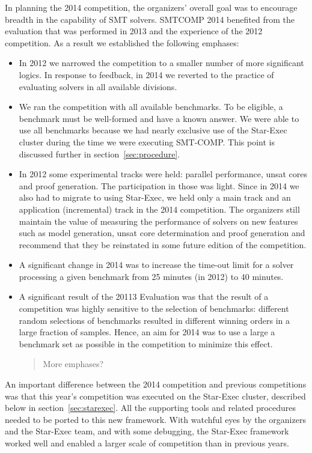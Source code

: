 \documentclass[twosize,11pt]{article}
\newcommand{\comment}[2]{\begin{quote}\sc #1\marginpar{\textcolor{red}{$\ast^{\mbox{#2}}$}}\end{quote}}
\newcommand{\davidc}[1]{\comment{#1}{DC}}
\begin{document}
In planning the 2014 competition, the organizers' overall goal was to encourage breadth
in the capability of SMT solvers. SMTCOMP 2014 benefited from the evaluation that was performed in 2013 and the experience of the 2012 competition. As a result we established the following emphases:
\begin{itemize}
\item In 2012 we narrowed the competition to a smaller number of more significant logics. In response to feedback, in 2014 we reverted to the practice of evaluating solvers in all available divisions.
\item We ran the competition with all available benchmarks. To be eligible, a benchmark must be well-formed and have a known answer. We were able to use all benchmarks because we had nearly exclusive use of the Star-Exec cluster during the time we were executing SMT-COMP. This point is discussed further in section~\ref{sec:procedure}.
\item In 2012 some experimental tracks were held: parallel performance, unsat cores and proof generation. The participation in those was light. Since in 2014 we also had to migrate to using Star-Exec, we held only a main track and an application (incremental) track in the 2014 competition. The organizers still maintain the value of measuring the performance of solvers on new features such as model generation, unsat core determination and proof generation and recommend that they be reinstated in some future edition of the competition.
\item A significant change in 2014 was to increase the time-out limit for a solver processing a given benchmark from 25 minutes (in 2012) to 40 minutes.
\item A significant result of the 20113 Evaluation was that the result of a competition was highly sensitive to the selection of benchmarks: different random selections of benchmarks resulted in different winning orders in a large fraction of samples. Hence, an aim for 2014 was to use a large a benchmark set as possible in the competition to minimize this effect.

\davidc{More emphases?}

\end{itemize}

An important difference between the 2014 competition and previous competitions was that this year's competition was executed on the Star-Exec cluster, described below in section~\ref{sec:starexec}. All the supporting tools and related procedures needed to be ported to this new framework. With watchful eyes by the organizers and the Star-Exec team, and with some debugging, the Star-Exec framework worked well and enabled a larger scale of competition than in previous years.
\end{document}
